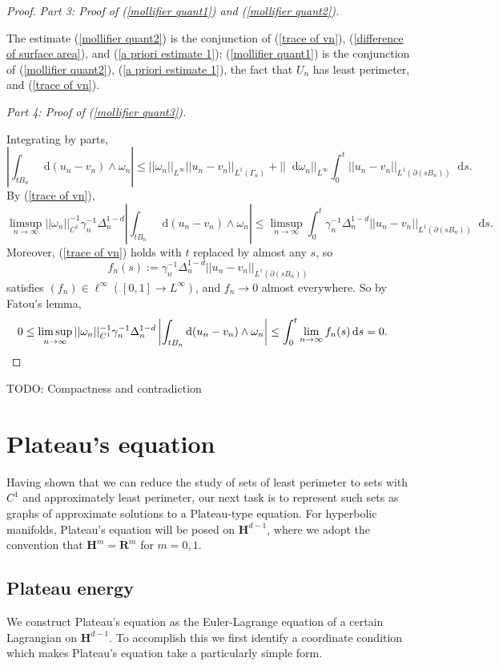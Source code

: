 \documentclass[reqno,10pt]{amsart}
\newcommand{\RR}{\mathbf{R}}
\newcommand{\Hyp}{\mathbf H}
\newcommand*\dif{\mathop{}\!\mathrm{d}}
\theoremstyle{definition}
\newcommand{\proofpart}[2]{%
  \par
  \addvspace{\medskipamount}%
  \noindent\emph{Part #1: #2.}
}
\numberwithin{equation}{section}
\begin{document}
\begin{proof}
\proofpart{3}{Proof of (\ref{mollifier quant1}) and (\ref{mollifier quant2})}
The estimate (\ref{mollifier quant2}) is the conjunction of (\ref{trace of vn}), (\ref{difference of surface area}), and (\ref{a priori estimate 1});
(\ref{mollifier quant1}) is the conjunction of (\ref{mollifier quant2}), (\ref{a priori estimate 1}), the fact that $U_n$ has least perimeter, and (\ref{trace of vn}).

\proofpart{4}{Proof of (\ref{mollifier quant3})}
Integrating by parts,
$$\left|\int_{tB_n} \dif (u_n - v_n) \wedge \omega_n\right| \leq ||\omega_n||_{L^\infty} ||u_n - v_n||_{L^1(\Gamma_n)} + ||\dif \omega_n||_{L^\infty} \int_0^t ||u_n - v_n||_{L^1(\partial(sB_n))} \dif s.$$
By (\ref{trace of vn}),
$$\limsup_{n \to \infty} ||\omega_n||_{C^1}^{-1} \gamma_n^{-1} \Delta_n^{1 - d} \left|\int_{tB_n} \dif(u_n - v_n) \wedge \omega_n\right| \leq \limsup_{n \to \infty} \int_0^t \gamma_n^{-1} \Delta_n^{1 - d} ||u_n - v_n||_{L^1(\partial(sB_n))} \dif s.$$
Moreover, (\ref{trace of vn}) holds with $t$ replaced by almost any $s$, so
$$f_n(s) := \gamma_n^{-1} \Delta_n^{1 - d} ||u_n - v_n||_{L^1(\partial(sB_n))}$$
satisfies $(f_n) \in \ell^\infty([0, 1] \to L^\infty)$, and $f_n \to 0$ almost everywhere.
So by Fatou's lemma,
\begin{align*}
0 \leq \limsup_{n \to \infty} ||\omega_n||_{C^1}^{-1} \gamma_n^{-1} \Delta_n^{1 - d} \left|\int_{tB_n} \dif(u_n - v_n) \wedge \omega_n\right| &\leq \int_0^t \lim_{n \to \infty} f_n(s) \dif s = 0. \qedhere
\end{align*}
\end{proof}

TODO: Compactness and contradiction


\section{Plateau's equation}\label{Plateau section}
Having shown that we can reduce the study of sets of least perimeter to sets with $C^1$ and approximately least perimeter, our next task is to represent such sets as graphs of approximate solutions to a Plateau-type equation.
For hyperbolic manifolds, Plateau's equation will be posed on $\Hyp^{d - 1}$, where we adopt the convention that $\Hyp^m = \RR^m$ for $m = 0, 1$.


\subsection{Plateau energy}
We construct Plateau's equation as the Euler-Lagrange equation of a certain Lagrangian on $\Hyp^{d - 1}$.
To accomplish this we first identify a coordinate condition which makes Plateau's equation take a particularly simple form.
\end{document}
